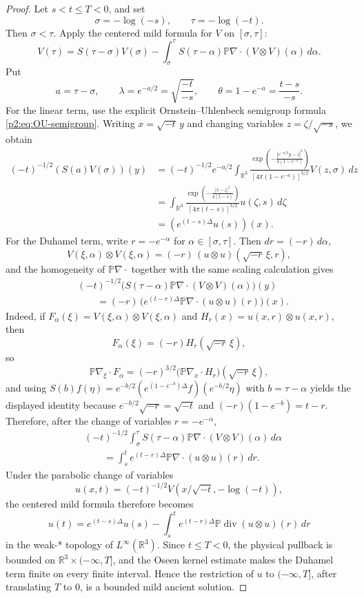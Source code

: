 \documentclass[11pt]{amsart}
\theoremstyle{plain}
\theoremstyle{definition}
\theoremstyle{remark}
\numberwithin{equation}{section}
\newcommand{\R}{\mathbb R}
\newcommand{\divergence}{\operatorname{div}}
\begin{document}
\begin{proof}
Let \(s<t\le T<0\), and set
\[
   \sigma=-\log(-s),\qquad \tau=-\log(-t).
\]
Then \(\sigma<\tau\).  Apply the centered mild formula for \(V\) on
\([\sigma,\tau]\):
\[
   V(\tau)
   =
   S(\tau-\sigma)V(\sigma)
   -
   \int_\sigma^\tau
   S(\tau-\alpha)\mathbb P\nabla\cdot(V\otimes V)(\alpha)\,d\alpha .
\]
Put
\[
   a=\tau-\sigma,\qquad \lambda=e^{-a/2}=\sqrt{\frac{-t}{-s}},
   \qquad \theta=1-e^{-a}=\frac{t-s}{-s}.
\]
For the linear term, use the explicit Ornstein--Uhlenbeck semigroup formula
\eqref{p2:eq:OU-semigroup}.  Writing \(x=\sqrt{-t}\,y\) and changing
variables \(z=\zeta/\sqrt{-s}\), we obtain
\[
\begin{aligned}
(-t)^{-1/2}(S(a)V(\sigma))(y)
&=(-t)^{-1/2}e^{-a/2}
  \int_{\R^3}
  \frac{\exp\!\left(-\frac{|e^{-a/2}y-z|^2}{4(1-e^{-a})}\right)}
       {[4\pi(1-e^{-a})]^{3/2}}
  V(z,\sigma)\,dz \\
&=\int_{\R^3}
  \frac{\exp\!\left(-\frac{|x-\zeta|^2}{4(t-s)}\right)}
       {[4\pi(t-s)]^{3/2}}
  u(\zeta,s)\,d\zeta \\
&=(e^{(t-s)\Delta}u(s))(x).
\end{aligned}
\]
For the Duhamel term, write \(r=-e^{-\alpha}\) for
\(\alpha\in[\sigma,\tau]\).  Then \(dr=(-r)\,d\alpha\),
\[
   V(\xi,\alpha)\otimes V(\xi,\alpha)
   =(-r)\,(u\otimes u)(\sqrt{-r}\,\xi,r),
\]
and the homogeneity of \(\mathbb P\nabla\cdot\) together with the same
scaling calculation gives
\[
\begin{aligned}
&(-t)^{-1/2}
  \bigl(S(\tau-\alpha)\mathbb P\nabla\cdot(V\otimes V)(\alpha)\bigr)(y) \\
&\qquad =
  (-r)\,
  \bigl(e^{(t-r)\Delta}\mathbb P\nabla\cdot(u\otimes u)(r)\bigr)(x).
\end{aligned}
\]
Indeed, if \(F_\alpha(\xi)=V(\xi,\alpha)\otimes V(\xi,\alpha)\) and
\(H_r(x)=u(x,r)\otimes u(x,r)\), then
\[
   F_\alpha(\xi)=(-r)H_r(\sqrt{-r}\,\xi),
\]
so
\[
   \mathbb P\nabla_\xi\cdot F_\alpha
   =(-r)^{3/2}
   \bigl(\mathbb P\nabla_x\cdot H_r\bigr)(\sqrt{-r}\,\xi),
\]
and using \(S(b)f(\eta)=e^{-b/2}(e^{(1-e^{-b})\Delta}f)(e^{-b/2}\eta)\)
with \(b=\tau-\alpha\) yields the displayed identity because
\(e^{-b/2}\sqrt{-r}=\sqrt{-t}\) and \((-r)(1-e^{-b})=t-r\).
Therefore, after the change of variables \(r=-e^{-\alpha}\),
\[
\begin{aligned}
&(-t)^{-1/2}
  \int_\sigma^\tau
  S(\tau-\alpha)\mathbb P\nabla\cdot(V\otimes V)(\alpha)\,d\alpha \\
&\qquad =
  \int_s^t
  e^{(t-r)\Delta}\mathbb P\nabla\cdot(u\otimes u)(r)\,dr .
\end{aligned}
\]
Under the parabolic change of variables
\[
   u(x,t)=(-t)^{-1/2}V(x/\sqrt{-t},-\log(-t)),
\]
the centered mild formula therefore becomes
\[
   u(t)
   =
   e^{(t-s)\Delta}u(s)
   -
   \int_s^t
   e^{(t-r)\Delta}\mathbb P\divergence(u\otimes u)(r)\,dr
\]
in the weak-* topology of \(L^\infty(\R^3)\).  Since \(t\le T<0\), the
physical pullback is bounded on \(\R^3\times(-\infty,T]\), and the Oseen
kernel estimate makes the Duhamel term finite on every finite interval.  Hence
the restriction of \(u\) to \((-\infty,T]\), after translating \(T\) to \(0\),
is a bounded mild ancient solution.
\end{proof}
\end{document}
